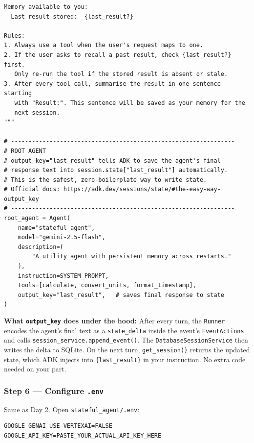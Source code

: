 \documentclass[12pt, a4paper]{article}
\begin{document}
\begin{practicalbox}
\begin{lstlisting}[style=pythonstyle, caption={stateful\_agent/agent.py --- stateful agent with DatabaseSessionService}]
Memory available to you:
  Last result stored:  {last_result?}

Rules:
1. Always use a tool when the user's request maps to one.
2. If the user asks to recall a past result, check {last_result?} first.
   Only re-run the tool if the stored result is absent or stale.
3. After every tool call, summarise the result in one sentence starting
   with "Result:". This sentence will be saved as your memory for the
   next session.
"""

# ----------------------------------------------------------------
# ROOT AGENT
# output_key="last_result" tells ADK to save the agent's final
# response text into session.state["last_result"] automatically.
# This is the safest, zero-boilerplate way to write state.
# Official docs: https://adk.dev/sessions/state/#the-easy-way-output_key
# ----------------------------------------------------------------
root_agent = Agent(
    name="stateful_agent",
    model="gemini-2.5-flash",
    description=(
        "A utility agent with persistent memory across restarts."
    ),
    instruction=SYSTEM_PROMPT,
    tools=[calculate, convert_units, format_timestamp],
    output_key="last_result",   # saves final response to state
)
\end{lstlisting}

\begin{notebox}
\textbf{What \texttt{output\_key} does under the hood:} After every turn, the
\texttt{Runner} encodes the agent's final text as a \texttt{state\_delta} inside
the event's \texttt{EventActions} and calls
\texttt{session\_service.append\_event()}. The \texttt{DatabaseSessionService}
then writes the delta to SQLite. On the next turn, \texttt{get\_session()}
returns the updated state, which ADK injects into \texttt{\{last\_result\}} in
your instruction. No extra code needed on your part.
\end{notebox}

\subsubsection*{Step 6 --- Configure \texttt{.env}}

Same as Day 2. Open \texttt{stateful\_agent/.env}:

\begin{lstlisting}[style=bashstyle, caption={stateful\_agent/.env}]
GOOGLE_GENAI_USE_VERTEXAI=FALSE
GOOGLE_API_KEY=PASTE_YOUR_ACTUAL_API_KEY_HERE
\end{lstlisting}


\end{practicalbox}
\end{document}
